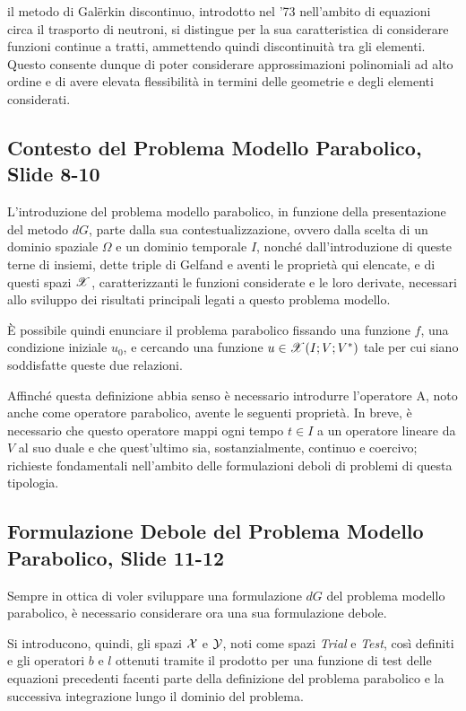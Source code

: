 \documentclass[12pt]{article}
\begin{document}
    il metodo di Galërkin discontinuo, introdotto nel '73 nell'ambito di equazioni circa il trasporto di neutroni, si distingue per la sua caratteristica di considerare funzioni continue a tratti, ammettendo quindi discontinuità tra gli elementi. Questo consente dunque di poter considerare approssimazioni polinomiali ad alto ordine e di avere elevata flessibilità in termini delle geometrie e degli elementi considerati.

    \subsection{Contesto del Problema Modello Parabolico, Slide 8-10}

    L'introduzione del problema modello parabolico, in funzione della presentazione del metodo $dG$, parte dalla sua contestualizzazione, ovvero dalla scelta di un dominio spaziale $\Omega$ e un dominio temporale $I$, nonché dall'introduzione di queste terne di insiemi, dette triple di Gelfand e aventi le proprietà qui elencate, e di questi spazi $\mathscr{X}$, caratterizzanti le funzioni considerate e le loro derivate, necessari allo sviluppo dei risultati principali legati a questo problema modello.

    È possibile quindi enunciare il problema parabolico fissando una funzione $f$, una condizione iniziale $u_0$, e cercando una funzione $u \in \mathscr{X}(I; V; V^*)$ tale per cui siano soddisfatte queste due relazioni.

    Affinché questa definizione abbia senso è necessario introdurre l'operatore A, noto anche come operatore parabolico, avente le seguenti proprietà. In breve, è necessario che questo operatore mappi ogni tempo $t \in I$ a un operatore lineare da $V$ al suo duale e che quest'ultimo sia, sostanzialmente, continuo e coercivo; richieste fondamentali nell'ambito delle formulazioni deboli di problemi di questa tipologia.

    \subsection{Formulazione Debole del Problema Modello Parabolico, Slide 11-12}

    Sempre in ottica di voler sviluppare una formulazione $dG$ del problema modello parabolico, è necessario considerare ora una sua formulazione debole.

    Si introducono, quindi, gli spazi $\mathcal{X}$ e $\mathcal{Y}$, noti come spazi \textit{Trial} e \textit{Test}, così definiti e gli operatori $b$ e $l$ ottenuti tramite il prodotto per una funzione di test delle equazioni precedenti facenti parte della definizione del problema parabolico e la successiva integrazione lungo il dominio del problema.
\end{document}
